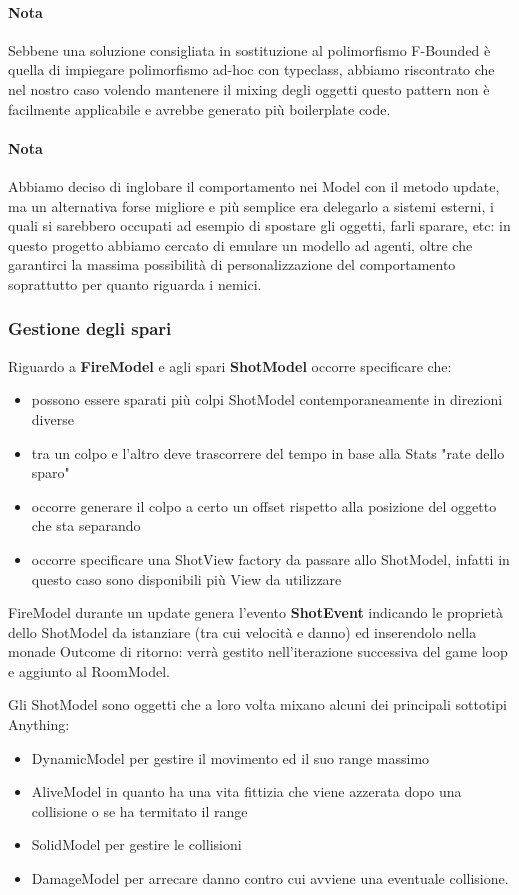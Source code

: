 \paragraph{Nota} Sebbene una soluzione consigliata in sostituzione al polimorfismo F-Bounded è quella di impiegare polimorfismo ad-hoc con typeclass, abbiamo riscontrato che nel nostro caso volendo mantenere il mixing degli oggetti questo pattern non è facilmente applicabile e avrebbe generato più boilerplate code.

\paragraph{Nota}
Abbiamo deciso di inglobare il comportamento nei Model con il metodo update, ma un alternativa forse migliore e più semplice era delegarlo a sistemi esterni, i quali si sarebbero occupati ad esempio di spostare gli oggetti, farli sparare, etc: in questo progetto abbiamo cercato di emulare un modello ad agenti, oltre che garantirci la massima possibilità di personalizzazione del comportamento soprattutto per quanto riguarda i nemici. 

\subsubsection{Gestione degli spari}
Riguardo a \textbf{FireModel} e agli spari \textbf{ShotModel} occorre specificare che:
\begin{itemize}
    \item possono essere sparati più colpi ShotModel contemporaneamente in direzioni diverse
    \item tra un colpo e l'altro deve trascorrere del tempo in base alla Stats "rate dello sparo"
    \item occorre generare il colpo a certo un offset rispetto alla posizione del oggetto che sta separando
    \item occorre specificare una ShotView factory da passare allo ShotModel, infatti in questo caso sono disponibili più View da utilizzare
\end{itemize}

FireModel durante un update genera l'evento \textbf{ShotEvent} indicando le proprietà dello ShotModel da istanziare (tra cui velocità e danno) ed inserendolo nella monade Outcome di ritorno: verrà gestito nell'iterazione successiva del game loop e aggiunto al RoomModel.

Gli ShotModel sono oggetti che a loro volta mixano alcuni dei principali sottotipi Anything: 
\begin{itemize}
	\item DynamicModel per gestire il movimento ed il suo range massimo
	\item AliveModel in quanto ha una vita fittizia che viene azzerata dopo una collisione o se ha termitato il range 
	\item SolidModel per gestire le collisioni
	\item DamageModel per arrecare danno contro cui avviene una eventuale collisione.
\end{itemize}

